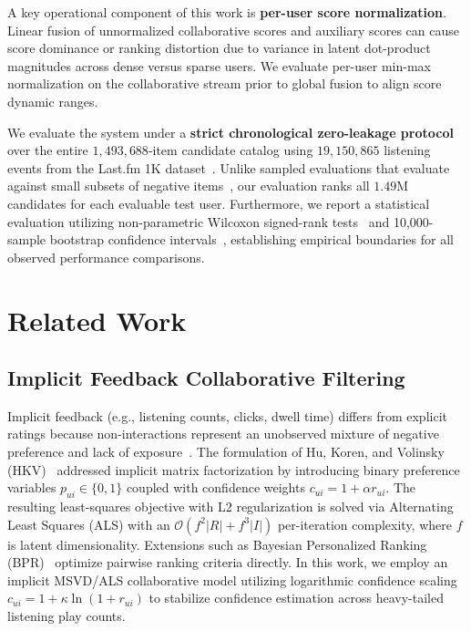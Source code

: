 \documentclass[conference]{IEEEtran}
\begin{document}
A key operational component of this work is \textbf{per-user score normalization}. Linear fusion of unnormalized collaborative scores and auxiliary scores can cause score dominance or ranking distortion due to variance in latent dot-product magnitudes across dense versus sparse users. We evaluate per-user min-max normalization on the collaborative stream prior to global fusion to align score dynamic ranges.

We evaluate the system under a \textbf{strict chronological zero-leakage protocol} over the entire $1,493,688$-item candidate catalog using $19,150,865$ listening events from the Last.fm 1K dataset~\cite{celma2008music}. Unlike sampled evaluations that evaluate against small subsets of negative items~\cite{cremonesi2010performance}, our evaluation ranks all $1.49\text{M}$ candidates for each evaluable test user. Furthermore, we report a statistical evaluation utilizing non-parametric Wilcoxon signed-rank tests~\cite{wilcoxon1945individual} and 10,000-sample bootstrap confidence intervals~\cite{efron1994introduction}, establishing empirical boundaries for all observed performance comparisons.

\section{Related Work}
\subsection{Implicit Feedback Collaborative Filtering}
Implicit feedback (e.g., listening counts, clicks, dwell time) differs from explicit ratings because non-interactions represent an unobserved mixture of negative preference and lack of exposure~\cite{steck2010training,liang2016modeling}. The formulation of Hu, Koren, and Volinsky (HKV)~\cite{hu2008collaborative} addressed implicit matrix factorization by introducing binary preference variables $p_{ui} \in \{0, 1\}$ coupled with confidence weights $c_{ui} = 1 + \alpha r_{ui}$. The resulting least-squares objective with L2 regularization is solved via Alternating Least Squares (ALS) with an $\mathcal{O}(f^2 |R| + f^3 |I|)$ per-iteration complexity, where $f$ is latent dimensionality. Extensions such as Bayesian Personalized Ranking (BPR)~\cite{rendle2012bpr} optimize pairwise ranking criteria directly. In this work, we employ an implicit MSVD/ALS collaborative model utilizing logarithmic confidence scaling $c_{ui} = 1 + \kappa \ln(1 + r_{ui})$ to stabilize confidence estimation across heavy-tailed listening play counts.
\end{document}
